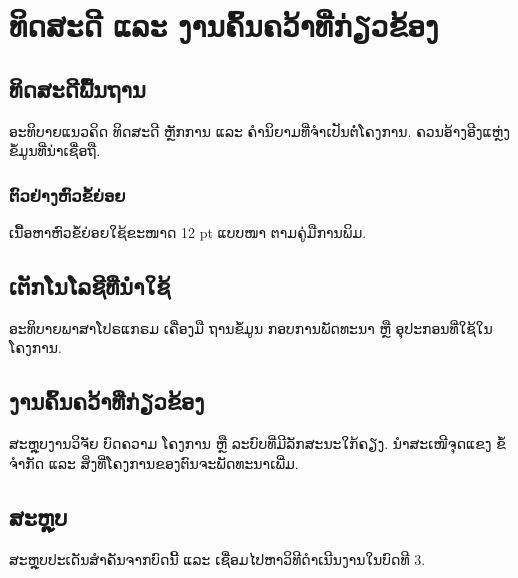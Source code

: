 \chapter{ທິດສະດີ ແລະ ງານຄົ້ນຄວ້າທີ່ກ່ຽວຂ້ອງ}

\section{ທິດສະດີພື້ນຖານ}
ອະທິບາຍແນວຄິດ ທິດສະດີ ຫຼັກການ ແລະ ຄຳນິຍາມທີ່ຈຳເປັນຕໍ່ໂຄງການ. ຄວນອ້າງອີງແຫຼ່ງຂໍ້ມູນທີ່ນ່າເຊື່ອຖື.

\subsection{ຕົວຢ່າງຫົວຂໍ້ຍ່ອຍ}
ເນື້ອຫາຫົວຂໍ້ຍ່ອຍໃຊ້ຂະໜາດ 12 pt ແບບໜາ ຕາມຄູ່ມືການພິມ.

\section{ເຕັກໂນໂລຊີທີ່ນຳໃຊ້}
ອະທິບາຍພາສາໂປຣແກຣມ ເຄື່ອງມື ຖານຂໍ້ມູນ ກອບການພັດທະນາ ຫຼື ອຸປະກອນທີ່ໃຊ້ໃນໂຄງການ.

\section{ງານຄົ້ນຄວ້າທີ່ກ່ຽວຂ້ອງ}
ສະຫຼຸບງານວິຈັຍ ບົດຄວາມ ໂຄງການ ຫຼື ລະບົບທີ່ມີລັກສະນະໃກ້ຄຽງ. ນຳສະເໜີຈຸດແຂງ ຂໍ້ຈຳກັດ ແລະ ສິ່ງທີ່ໂຄງການຂອງຕົນຈະພັດທະນາເພີ່ມ.

\section{ສະຫຼຸບ}
ສະຫຼຸບປະເດັນສຳຄັນຈາກບົດນີ້ ແລະ ເຊື່ອມໄປຫາວິທີດຳເນີນງານໃນບົດທີ 3.
